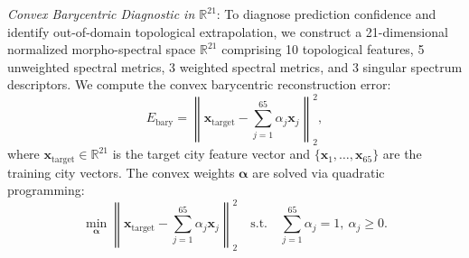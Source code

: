 \documentclass[journal]{IEEEtran}
\begin{document}
\textit{Convex Barycentric Diagnostic in $\mathbb{R}^{21}$}: To diagnose prediction confidence and identify out-of-domain topological extrapolation, we construct a 21-dimensional normalized morpho-spectral space $\mathbb{R}^{21}$ comprising 10 topological features, 5 unweighted spectral metrics, 3 weighted spectral metrics, and 3 singular spectrum descriptors. We compute the convex barycentric reconstruction error:
\begin{equation}
E_{\text{bary}} = \left\| \mathbf{x}_{\text{target}} - \sum_{j=1}^{65} \alpha_j \mathbf{x}_j \right\|_2^2,
\end{equation}
where $\mathbf{x}_{\text{target}} \in \mathbb{R}^{21}$ is the target city feature vector and $\{\mathbf{x}_1, \dots, \mathbf{x}_{65}\}$ are the training city vectors. The convex weights $\boldsymbol{\alpha}$ are solved via quadratic programming:
\begin{equation}
\min_{\boldsymbol{\alpha}} \left\| \mathbf{x}_{\text{target}} - \sum_{j=1}^{65} \alpha_j \mathbf{x}_j \right\|_2^2 \quad \text{s.t.} \quad \sum_{j=1}^{65} \alpha_j = 1, \ \alpha_j \ge 0.
\end{equation}

\begin{table}[htbp]
\caption{Barycentric Reconstruction Error vs. Max Relative Error}
\label{tab:barycentric}
\centering
{}
\end{table}
\end{document}
